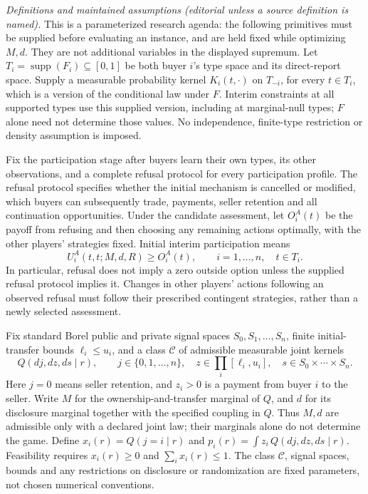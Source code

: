 \documentclass[11pt,a4paper]{article}
\newcommand{\supp}{\operatorname{supp}}
\begin{document}
\emph{Definitions and maintained assumptions (editorial unless a source definition is named).} This is a parameterized research agenda: the following primitives must be supplied before evaluating an instance, and are held fixed while optimizing \(M,d\). They are not additional variables in the displayed supremum. Let \(T_i=\supp(F_i)\subseteq[0,1]\) be both buyer \(i\)'s type space and its direct-report space. Supply a measurable probability kernel \(K_i(t,\cdot)\) on \(T_{-i}\), for every \(t\in T_i\), which is a version of the conditional law under \(F\). Interim constraints at all supported types use this supplied version, including at marginal-null types; \(F\) alone need not determine those values. No independence, finite-type restriction or density assumption is imposed.

Fix the participation stage after buyers learn their own types, its other observations, and a complete refusal protocol for every participation profile. The refusal protocol specifies whether the initial mechanism is cancelled or modified, which buyers can subsequently trade, payments, seller retention and all continuation opportunities. Under the candidate assessment, let \(O_i^A(t)\) be the payoff from refusing and then choosing any remaining actions optimally, with the other players' strategies fixed. Initial interim participation means
\[
 U_i^A(t,t;M,d,R)\geq O_i^A(t),\qquad i=1,\ldots,n,\quad t\in T_i.
\]
In particular, refusal does not imply a zero outside option unless the supplied refusal protocol implies it. Changes in other players' actions following an observed refusal must follow their prescribed contingent strategies, rather than a newly selected assessment.

Fix standard Borel public and private signal spaces \(S_0,S_1,\ldots,S_n\), finite initial-transfer bounds \(\ell_i\leq u_i\), and a class \(\mathcal C\) of admissible measurable joint kernels
\[
 Q(dj,dz,ds\mid r),\qquad
 j\in\{0,1,\ldots,n\},\quad
 z\in\prod_i[\ell_i,u_i],\quad
 s\in S_0\times\cdots\times S_n.
\]
Here \(j=0\) means seller retention, and \(z_i>0\) is a payment from buyer \(i\) to the seller. Write \(M\) for the ownership-and-transfer marginal of \(Q\), and \(d\) for its disclosure marginal together with the specified coupling in \(Q\). Thus \(M,d\) are admissible only with a declared joint law; their marginals alone do not determine the game. Define \(x_i(r)=Q(j=i\mid r)\) and \(p_i(r)=\int z_i\,Q(dj,dz,ds\mid r)\). Feasibility requires \(x_i(r)\geq0\) and \(\sum_i x_i(r)\leq1\). The class \(\mathcal C\), signal spaces, bounds and any restrictions on disclosure or randomization are fixed parameters, not chosen numerical conventions.
\end{document}
